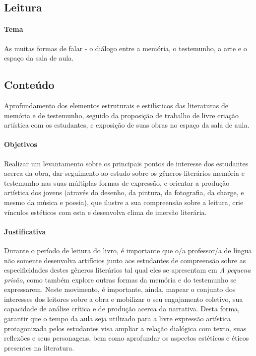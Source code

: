 \documentclass[11pt]{extarticle}
\begin{document}
\subsection{Leitura}

\paragraph{Tema} As muitas formas de falar - o diálogo entre a memória,
o testemunho, a arte e o espaço da sala de aula.

\subsection{Conteúdo} Aprofundamento dos elementos estruturais e
estilísticos das literaturas de memória e de testemunho, seguido da
proposição de trabalho de livre criação artística com os estudantes, e
exposição de suas obras no espaço da sala de aula.

\paragraph{Objetivos} Realizar um levantamento sobre os principais pontos
de interesse dos estudantes acerca da obra, dar seguimento ao estudo
sobre os gêneros literários memória e testemunho nas suas múltiplas
formas de expressão, e orientar a produção artística dos jovens (através
do desenho, da pintura, da fotografia, da charge, e mesmo da música e
poesia), que ilustre a sua compreensão sobre a leitura, crie vínculos
estéticos com esta e desenvolva clima de imersão literária.

\paragraph{Justificativa} Durante o período de leitura do livro, é
importante que o/a professor/a de língua não somente desenvolva
artifícios junto aos estudantes de compreensão sobre as especificidades
destes gêneros literários tal qual eles se apresentam em \emph{A pequena
prisão}, como também explore outras formas da memória e do testemunho se
expressarem. Neste movimento, é importante, ainda, mapear o conjunto dos
interesses dos leitores sobre a obra e mobilizar o seu engajamento
coletivo, sua capacidade de análise crítica e de produção acerca da
narrativa. Desta forma, garantir que o tempo da aula seja utilizado para
a livre expressão artística protagonizada pelos estudantes visa ampliar
a relação dialógica com texto, suas reflexões e seus personagens, bem
como aprofundar os aspectos estéticos e éticos presentes na literatura.
\end{document}
